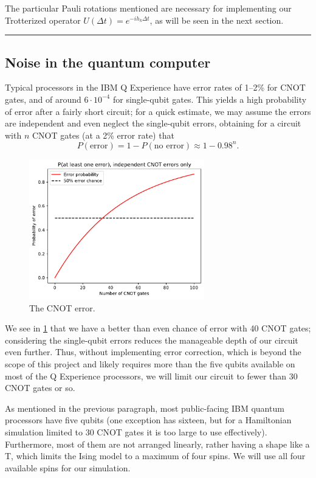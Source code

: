 \documentclass[10pt]{amsart}
\theoremstyle{definition}
\newcommand\separator{\vspace{1em}\hrule \vspace{1em}}
\begin{document}
The particular Pauli rotations mentioned are necessary for implementing our
Trotterized operator $U(\Delta t) = e^{-i h_k \Delta t}$, as will be seen in the
next section.

\separator


\subsection{Noise in the quantum computer} \label{subsec:err}

Typical processors in the IBM Q Experience have error rates of 1--2\% for CNOT
gates, and of around $6 \cdot 10^{-4}$ for single-qubit gates. This yields a
high probability of error after a fairly short circuit; for a quick estimate, we
may assume the errors are independent and even neglect the single-qubit errors,
obtaining for a circuit with $n$ CNOT gates (at a 2\% error rate) that
\[
  P(\text{error}) = 1 - P(\text{no error}) \approx 1 - 0.98^n.
\]

\begin{figure}[htb!]
  \centering
  \includegraphics[width=3in]{Error.pdf}  
  \caption{The CNOT error.}
  \label{fig:err}
\end{figure}

We see in \cref{fig:err} that we have a better than even chance of error with
40 CNOT gates; considering the single-qubit errors reduces the manageable depth
of our circuit even further. Thus, without implementing error correction, which
is beyond the scope of this project and likely requires more than the five
qubits available on most of the Q Experience processors, we will limit our
circuit to fewer than 30 CNOT gates or so.

As mentioned in the previous paragraph, most public-facing IBM quantum
processors have five qubits (one exception has sixteen, but for a Hamiltonian
simulation limited to 30 CNOT gates it is too large to use effectively).
Furthermore, most of them are not arranged linearly, rather having a shape
like a T, which limits the Ising model to a maximum of four spins. We will use
all four available spins for our simulation.
\end{document}
